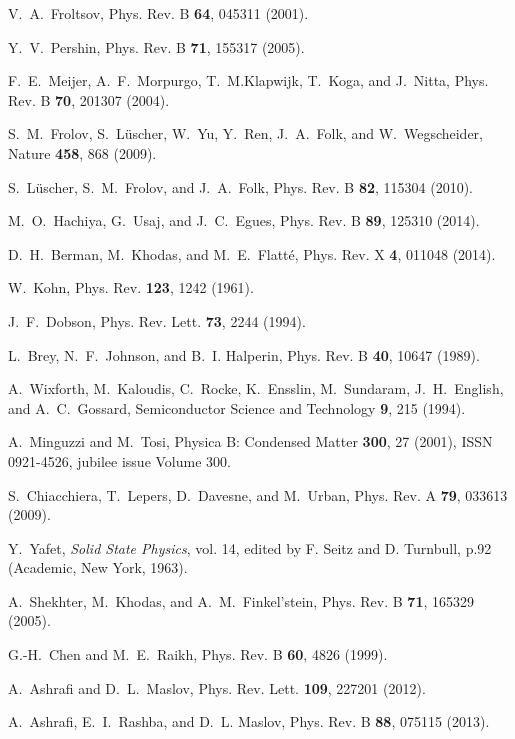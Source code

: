 \begin{thebibliography}{99}
 V.~A.~Froltsov, Phys. Rev. B \textbf{64}, 045311 (2001).

 Y.~V.~Pershin, Phys. Rev. B \textbf{71}, 155317 (2005).

 F.~E.~Meijer, A.~F.~Morpurgo, T.~M.Klapwijk, T.~Koga, and J.~Nitta, Phys. Rev. B \textbf{70}, 201307 (2004).

 S.~M.~Frolov, S.~L\"uscher, W.~Yu, Y.~Ren, J.~A.~Folk, and W.~Wegscheider, Nature \textbf{458}, 868 (2009).

 S.~L\"uscher, S.~M.~Frolov, and J.~A.~Folk, Phys. Rev. B \textbf{82}, 115304 (2010).

 M.~O.~Hachiya, G.~Usaj, and J.~C.~Egues, Phys. Rev. B \textbf{89}, 125310 (2014).

 D.~H.~Berman, M.~Khodas, and M.~E.~Flatt\'e, Phys. Rev. X \textbf{4}, 011048 (2014).

 W.~Kohn, Phys. Rev. \textbf{123}, 1242 (1961).

 J.~F.~Dobson, Phys. Rev. Lett. \textbf{73}, 2244 (1994).

 L.~Brey, N.~F.~Johnson, and B.~I. Halperin, Phys. Rev. B \textbf{40}, 10647 (1989).

A.~Wixforth, M.~Kaloudis, C.~Rocke, K.~Ensslin, M.~Sundaram, J.~H.~English, and A.~C.~Gossard, Semiconductor Science and Technology \textbf{9}, 215 (1994).

 A.~Minguzzi and M.~Tosi, Physica B: Condensed Matter \textbf{300}, 27 (2001), ISSN 0921-4526, jubilee issue Volume 300.

 S.~Chiacchiera, T.~Lepers, D.~Davesne, and M.~Urban, Phys. Rev. A \textbf{79}, 033613 (2009).

 Y.~Yafet, \emph{Solid State Physics}, vol.  14, edited by F. Seitz and D. Turnbull, p.92 (Academic, New York, 1963).

 A.~Shekhter, M.~Khodas, and A.~M.~Finkel'stein, Phys. Rev. B \textbf{71}, 165329 (2005).

 G.-H.~Chen and M.~E.~Raikh, Phys. Rev. B \textbf{60}, 4826 (1999).

 A.~Ashrafi and D.~L.~Maslov, Phys. Rev. Lett. \textbf{109}, 227201 (2012).

 A.~Ashrafi, E.~I.~Rashba, and D.~L. Maslov, Phys. Rev. B \textbf{88}, 075115 (2013).


\end{thebibliography}
